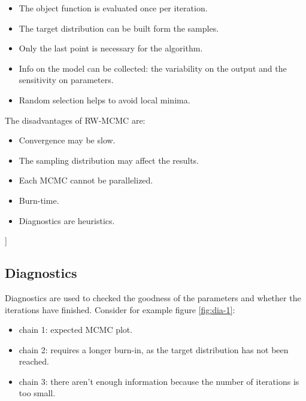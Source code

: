   \begin{multicols}{2}
    \begin{itemize}
      \item The object function is evaluated once per iteration.
      \item The target distribution can be built form the samples.
      \item Only the last point is necessary for the algorithm.
      \item Info on the model can be collected: the variability on the output and the sensitivity on parameters.
      \item Random selection helps to avoid local minima.
    \end{itemize}
  \end{multicols}

  The disadvantages of RW-MCMC are:

  \begin{multicols}{2}
    \begin{itemize}
      \item Convergence may be slow.
      \item The sampling distribution may affect the results.
      \item Each MCMC cannot be parallelized.
      \item Burn-time.
      \item Diagnostics are heuristics.
    \end{itemize}
  \end{multicols}]

  \subsection{Diagnostics}
  Diagnostics are used to checked the goodness of the parameters and whether the iterations have finished.
  Consider for example figure \ref{fig:dia-1}:

  \begin{multicols}{2}
    \begin{itemize}
      \item chain 1: expected MCMC plot.
      \item chain 2: requires a longer burn-in, as the target distribution has not been reached.
      \item chain 3: there aren't enough information because the number of iterations is too small.
    \end{itemize}
  \end{multicols}

